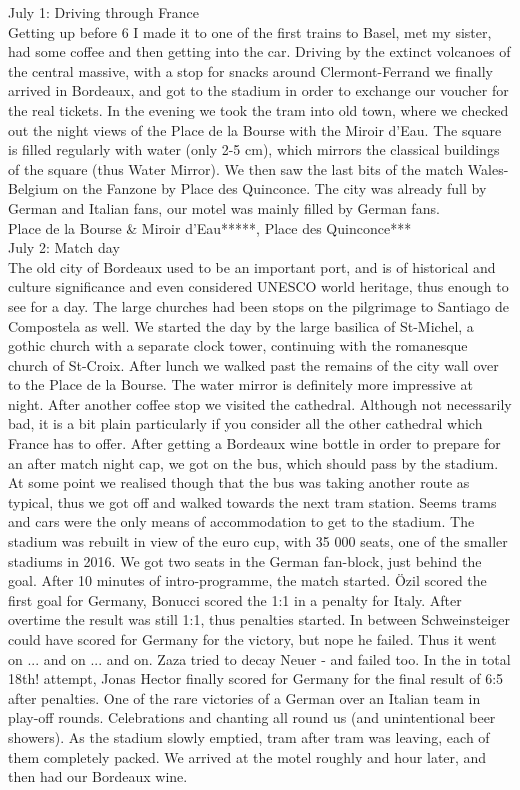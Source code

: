 July 1: Driving through France\\
Getting up before 6 I made it to one of the first trains to Basel, met my sister, had some coffee and then getting into the car. Driving by the extinct volcanoes of the central massive, with a stop for snacks around Clermont-Ferrand we finally arrived in Bordeaux, and got to the stadium in order to exchange our voucher for the real tickets. In the evening we took the tram into old town, where we checked out the night views of the Place de la Bourse with the Miroir d'Eau. The square is filled regularly with water (only 2-5 cm), which mirrors the classical buildings of the square (thus Water Mirror). We then saw the last bits of the match Wales-Belgium on the Fanzone by Place des Quinconce. The city was already full by German and Italian fans, our motel was mainly filled by German fans.\\

Place de la Bourse \& Miroir d'Eau*****, Place des Quinconce***\\

July 2: Match day\\
The old city of Bordeaux used to be an important port, and is of historical and culture significance and even considered UNESCO world heritage, thus enough to see for a day. The large churches had been stops on the pilgrimage to Santiago de Compostela as well. We started the day by the large basilica of St-Michel, a gothic church with a separate clock tower, continuing with the romanesque church of St-Croix. After lunch we walked past the remains of the city wall over to the Place de la Bourse. The water mirror is definitely more impressive at night. After another coffee stop we visited the cathedral. Although not necessarily bad, it is a bit plain particularly if you consider all the other cathedral which France has to offer. After getting a Bordeaux wine bottle in order to prepare for an after match night cap, we got on the bus, which should pass by the stadium. At some point we realised though that the bus was taking another route as typical, thus we got off and walked towards the next tram station. Seems trams and cars were the only means of accommodation to get to the stadium. The stadium was rebuilt in view of the euro cup, with 35 000 seats, one of the smaller stadiums in 2016. We got two seats in the German fan-block, just behind the goal. After 10 minutes of intro-programme, the match started. \"Ozil scored the first goal for Germany, Bonucci scored the 1:1 in a penalty for Italy. After overtime the result was still 1:1, thus penalties started. In between Schweinsteiger could have scored for Germany for the victory, but nope he failed. Thus it went on ... and on ... and on. Zaza tried to decay Neuer - and failed too. In the in total 18th! attempt, Jonas Hector finally scored for Germany for the final result of 6:5 after penalties. One of the rare victories of a German over an Italian team in play-off rounds. Celebrations and chanting all round us (and unintentional beer showers). As the stadium slowly emptied, tram after tram was leaving, each of them completely packed. We arrived at the motel roughly and hour later, and then had our Bordeaux wine.\\

